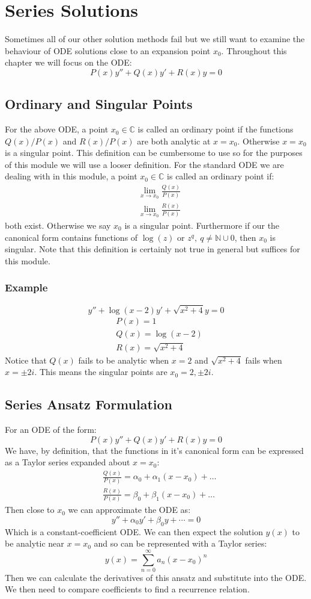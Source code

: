 \documentclass[12pt]{article}
\begin{document}
\section{Series Solutions}
Sometimes all of our other solution methods fail but we still want to examine the behaviour of ODE solutions close to an expansion point \(x_0\). Throughout this chapter we will focus on the ODE:
\[P(x)y''+Q(x)y'+R(x)y=0\]
\subsection{Ordinary and Singular Points}
For the above ODE, a point \(x_0\in\mathbb{C}\) is called an ordinary point if the functions \(Q(x)/P(x)\) and \(R(x)/P(x)\) are both analytic at \(x=x_0\). Otherwise \(x=x_0\) is a singular point. This definition can be cumbersome to use so for the purposes of this module we will use a looser definition. For the standard ODE we are dealing with in this module, a point \(x_0\in\mathbb{C}\) is called an ordinary point if:
\begin{align*}
  &\lim_{x\to x_0}\frac{Q(x)}{P(x)} \\
  &\lim_{x\to x_0}\frac{R(x)}{P(x)}
\end{align*}
both exist. Otherwise we say \(x_0\) is a singular point. Furthermore if our the canonical form contains functions of \(\log(z)\) or \(z^q,\ q\ne\mathbb{N}\cup 0\), then \(x_0\) is singular. Note that this definition is certainly not true in general but suffices for this module.
\subsubsection*{Example}
\[y''+\log (x-2)y'+\sqrt{x^2+4}y=0\]
\begin{align*}
    &P(x)=1 \\
    &Q(x)=\log(x-2) \\
    &R(x)=\sqrt{x^2+4}
\end{align*}
Notice that \(Q(x)\) fails to be analytic when \(x=2\) and \(\sqrt{x^2+4}\) fails when \(x=\pm 2i\). This means the singular points are \(x_0=2,\pm 2i\).
\subsection{Series Ansatz Formulation}
For an ODE of the form:
\[P(x)y''+Q(x)y'+R(x)y=0\]
We have, by definition, that the functions in it's canonical form can be expressed as a Taylor series expanded about \(x=x_0\):
\begin{align*}
    &\frac{Q(x)}{P(x)}=\alpha_0+\alpha_1(x-x_0)+\dots \\
    &\frac{R(x)}{P(x)}=\beta_0+\beta_1(x-x_0)+\dots
\end{align*}
Then close to \(x_0\) we can approximate the ODE as:
\[y''+\alpha_0y'+\beta_0y+\cdots=0\]
Which is a constant-coefficient ODE. We can then expect the solution \(y(x)\) to be analytic near \(x=x_0\) and so can be represented with a Taylor series:
\[y(x)=\sum^\infty_{n=0}a_n(x-x_0)^n\]
Then we can calculate the derivatives of this ansatz and substitute into the ODE. We then need to compare coefficients to find a recurrence relation.
\end{document}
